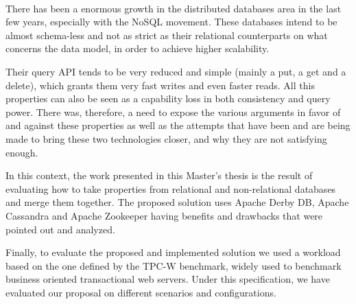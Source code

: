 
\paragraph{}

There has been a enormous growth in the distributed databases area in the last few years, especially with the NoSQL movement. These databases intend to be almost schema-less and not as strict as their relational counterparts on what concerns the data model, in order to achieve higher scalability. 

Their query API tends to be very reduced and simple (mainly a put, a get and a delete), which grants them very fast writes and even faster reads. All this properties can also be seen as a capability loss in both consistency and query power. There was, therefore, a need to expose the various arguments in favor of and against these properties as well as the attempts that have been and are being made to bring these two technologies closer, and why they are not satisfying enough.

In this context, the work presented in this Master's thesis is the result of evaluating how to take properties from relational and non-relational databases and merge them together. The proposed solution uses Apache Derby DB, Apache Cassandra and Apache Zookeeper having benefits and drawbacks that were pointed out and analyzed.

Finally, to evaluate the proposed and implemented solution we used a workload based on the one defined by the TPC-W benchmark, widely used to benchmark business oriented transactional web servers. Under this specification, we have evaluated our proposal on different scenarios and configurations.